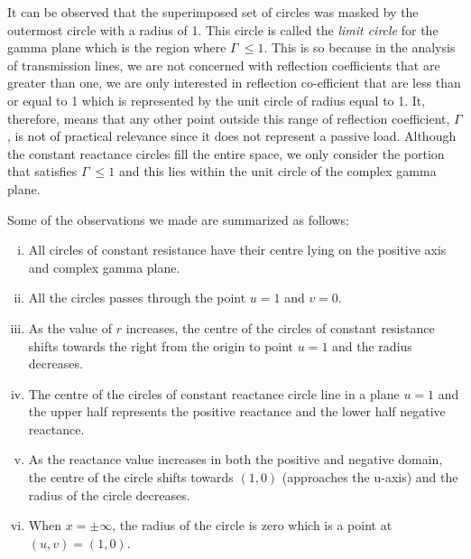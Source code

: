 It can be observed that the superimposed set of circles was masked by the outermost circle with a radius of 1. This circle is called the \emph{limit circle} for the gamma plane which is the region where $\Gamma\ \leq 1$. This is so because in the analysis of transmission lines, we are not concerned with reflection coefficients that are greater than one, we are only interested in reflection co-efficient that are less than or equal to 1 which is represented by the unit circle of radius equal to 1. It, therefore, means that any other point outside this range of reflection coefficient, $\Gamma$, is not of practical relevance since it does not represent a passive load. Although the constant reactance circles fill the entire space, we only consider the portion that satisfies $ \Gamma\ \leq 1$ and this lies within the unit circle of the complex gamma plane.

Some of the observations we made are summarized as follows:
\begin{enumerate}[(i)]
\item All circles of constant resistance have their centre lying on the positive axis and complex gamma plane.
\item All the circles passes through the point $u = 1$ and $v = 0$.
\item As the value of $r$ increases, the centre of the circles of constant resistance shifts towards the right from the origin to point $u = 1$ and the radius decreases.
\item The centre of the circles of constant reactance circle line in a plane $u = 1$ and the upper half represents the positive reactance and the lower half negative reactance.
\item As the reactance value increases in both the positive and negative domain, the centre of the circle shifts towards $(1, 0)$ (approaches the u-axis) and the radius of the circle decreases.
\item When $x = \pm\infty$, the radius of the circle is zero which is a point at $(u,v) = (1,0)$.
\end{enumerate}

